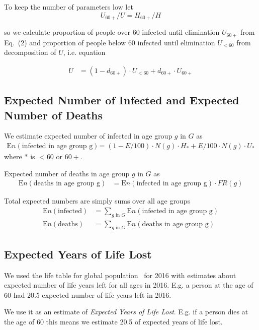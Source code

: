 \documentclass[12pt]{article}
\begin{document}
To keep the number of parameters low let
\begin{equation*}
	U_{60+} / U = H_{60+} / H
	\tag{2}
\end{equation*}

so we calculate proportion of people over 60 infected until elimination $U_{60+}$ from Eq.~(2) and proportion of people below 60 infected until elimination $U_{<60}$ from decomposition of $U$, i.e. equation

\begin{align*}
U &= (1 - d_{60+}) \cdot U_{<60} + d_{60+} \cdot U_{60+}
\end{align*}

\subsection*{Expected Number of Infected and Expected Number of Deaths}
We estimate expected number of infected in age group $g$ in $G$ as
\begin{align*}
  \text{E} n(\text{infected in age group g})  &=
    (1 - E/100) \cdot N(g) \cdot H_{\text{*}} + E/100 \cdot N(g) \cdot U_{\text{*}}
\end{align*}
where $\text{*}$ is $<60$ or $60+$.

Expected number of deaths in age group $g$ in $G$ as
\begin{align*}
  \text{E} n(\text{deaths in age group g})  &=
    \text{E} n(\text{infected in age group g})  \cdot FR(g)
\end{align*}

Total expected numbers are simply sums over all age groups
\begin{align*}
  \text{E} n(\text{infected})  &= \sum_{g \text{ in } G} \text{E} n(\text{infected in age group g})  \\
  \text{E} n(\text{deaths})  &= \sum_{g \text{ in } G} \text{E} n(\text{deaths in age group g}) 
\end{align*}

\subsection*{Expected Years of Life Lost}
We used the life table for global population~\cite{expectancies} for 2016 with estimates about expected number of life years left for all ages in 2016. E.g. a person at the age of 60 had 20.5 expected number of life years left in 2016.

We use it as an estimate of {\it Expected Years of Life Lost}. E.g. if a person dies at the age of 60 this means we estimate 20.5 of expected years of life lost.
\end{document}
